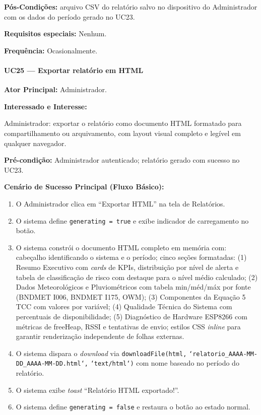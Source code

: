 \textbf{Pós-Condições:} arquivo CSV do relatório salvo
no dispositivo do Administrador com os dados do período
gerado no UC23.

\textbf{Requisitos especiais:} Nenhum.

\textbf{Frequência:} Ocasionalmente.

\paragraph{UC25 --- Exportar relatório em HTML}\hfill\break

\textbf{Ator Principal:} Administrador.

\textbf{Interessado e Interesse:}

Administrador: exportar o relatório como documento HTML
formatado para compartilhamento ou arquivamento, com
layout visual completo e legível em qualquer navegador.

\textbf{Pré-condição:} Administrador autenticado;
relatório gerado com sucesso no UC23.

\textbf{Cenário de Sucesso Principal (Fluxo Básico):}
\begin{enumerate}
  \item O Administrador clica em ``Exportar HTML'' na
        tela de Relatórios.
  \item O sistema define \texttt{generating = true} e
        exibe indicador de carregamento no botão.
  \item O sistema constrói o documento HTML completo
        em memória com: cabeçalho identificando o
        sistema e o período; cinco seções formatadas:
        (1) Resumo Executivo com \textit{cards} de KPIs,
        distribuição por nível de alerta e tabela de
        classificação de risco com destaque para o
        nível médio calculado; (2) Dados Meteorológicos
        e Pluviométricos com tabela min/méd/máx por
        fonte (BNDMET I006, BNDMET I175, OWM); (3)
        Componentes da Equação 5 TCC com valores por
        variável; (4) Qualidade Técnica do Sistema com
        percentuais de disponibilidade; (5) Diagnóstico
        de Hardware ESP8266 com métricas de freeHeap,
        RSSI e tentativas de envio; estilos CSS
        \textit{inline} para garantir renderização
        independente de folhas externas.
  \item O sistema dispara o \textit{download} via
        \texttt{downloadFile(html,} \linebreak
        \texttt{`relatorio\_AAAA-MM-DD\_AAAA-MM-DD.html`,}
        \texttt{`text/html`)} com nome baseado no
        período do relatório.
  \item O sistema exibe \textit{toast}
        ``Relatório HTML exportado!''.
  \item O sistema define \texttt{generating = false}
        e restaura o botão ao estado normal.
\end{enumerate}

